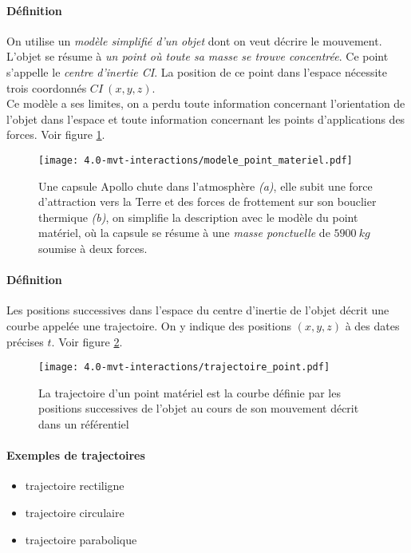 \paragraph{Définition} On utilise un \textit{ modèle simplifié d'un objet} dont on veut décrire le mouvement. L'objet se résume à \textit{un point où toute sa masse se trouve concentrée}. Ce point s'appelle le \textit{centre d'inertie CI}.
La position de ce point dans l'espace nécessite trois coordonnés $CI~ \left( x,y,z \right)$. \\ 
Ce modèle a ses limites, on a perdu toute information concernant l'orientation de l'objet dans l'espace et toute information concernant les points d'applications des forces. Voir figure \ref{fig:modele_point_materiel}.
\begin{figure}[h!]
  \begin{center}
      \texttt{[image: 4.0-mvt-interactions/modele\_point\_materiel.pdf]}
  \end{center}
  \caption{Une capsule Apollo chute dans l'atmosphère \textit{(a)}, elle subit une force d'attraction
  vers la Terre et des forces de frottement sur son bouclier thermique \textit{(b)}, on simplifie
  la description avec le modèle du point matériel, où la capsule se résume à une \textit{masse ponctuelle} de $5900~kg$ soumise à deux forces.}
  \label{fig:modele_point_materiel}
\end{figure}

\paragraph{Définition} Les positions successives dans l'espace du centre d'inertie de l'objet décrit une courbe appelée
une trajectoire. On y indique des positions $(x,y,z)$ à des dates précises $t$. Voir figure \ref{fig:def_trajectoire}.
\begin{figure}[h!]
  \begin{center}
      \texttt{[image: 4.0-mvt-interactions/trajectoire\_point.pdf]}
  \end{center}
  \caption{La trajectoire d'un point matériel est la courbe définie par les positions successives de l'objet au cours de son mouvement décrit dans un référentiel}
  \label{fig:def_trajectoire}
\end{figure}
\paragraph{Exemples de trajectoires}
\begin{itemize}
 \item trajectoire rectiligne  
 \item trajectoire circulaire
 \item trajectoire parabolique
\end{itemize}


